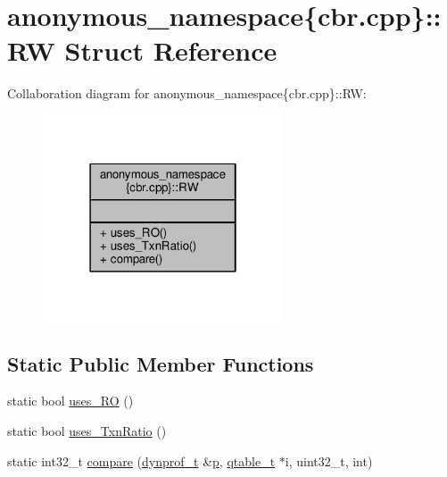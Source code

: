 \hypertarget{structanonymous__namespace_02cbr_8cpp_03_1_1RW}{\section{anonymous\-\_\-namespace\{cbr.\-cpp\}\-:\-:R\-W Struct Reference}
\label{structanonymous__namespace_02cbr_8cpp_03_1_1RW}
}


Collaboration diagram for anonymous\-\_\-namespace\{cbr.\-cpp\}\-:\-:R\-W\-:
\nopagebreak
\begin{figure}[H]
\begin{center}
\leavevmode
\includegraphics[width=202pt]{structanonymous__namespace_02cbr_8cpp_03_1_1RW__coll__graph}
\end{center}
\end{figure}
\subsection*{Static Public Member Functions}
\begin{DoxyCompactItemize}
\item 
static bool \hyperlink{structanonymous__namespace_02cbr_8cpp_03_1_1RW_a23c2338debe9dffeb49e866b895b9c70}{uses\-\_\-\-R\-O} ()
\item 
static bool \hyperlink{structanonymous__namespace_02cbr_8cpp_03_1_1RW_a99edf87a58660638ecdd3c79653bb692}{uses\-\_\-\-Txn\-Ratio} ()
\item 
static int32\-\_\-t \hyperlink{structanonymous__namespace_02cbr_8cpp_03_1_1RW_abe953ce9c1008c26463a18112934dd01}{compare} (\hyperlink{structstm_1_1dynprof__t}{dynprof\-\_\-t} \&\hyperlink{counted__ptr_8hpp_a5c9f59d7c24e3fd6ceae319a968fc3e0}{p}, \hyperlink{structstm_1_1qtable__t}{qtable\-\_\-t} $\ast$i, uint32\-\_\-t, int)
\end{DoxyCompactItemize}


